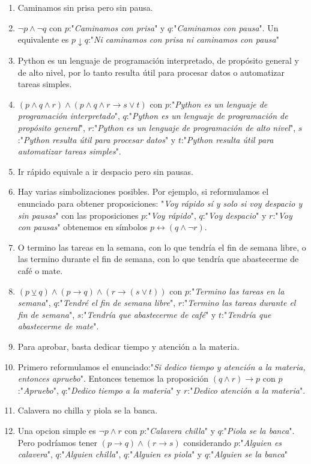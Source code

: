 \documentclass[a4paper]{article}
\newcommand{\answer}{\item[**]}
\newcommand{\then}{\to}
\newcommand{\eq}{\leftrightarrow}
\newcommand{\xor}{\veebar}
\begin{document}
\begin{enumerate}[resume]
\begin{multicols}{2}
\begin{enumerate} [label=(\alph*)]
		\item Caminamos sin prisa pero sin pausa. 
		\answer $\neg p  \land  \neg q$ con $p$:"\textit{Caminamos con prisa}" y $q$:"\textit{Caminamos con pausa}". Un equivalente es $p \downarrow  q$:"\textit{Ni caminamos con prisa ni caminamos con pausa}"

		\item Python es un lenguaje de programación interpretado, de propósito general y de alto nivel, por lo tanto resulta útil para procesar datos o automatizar tareas simples. 
		\answer $( p  \land  q  \land  r ) \land ( p  \land  q  \land  r  \then   s \lor  t )$ con $p$:"\textit{Python es un lenguaje de programación interpretado}", $q$:"\textit{Python es un lenguaje de programación  de propósito general}", $r$:"\textit{Python es un lenguaje de programación de alto nivel}", $s$:"\textit{Python resulta útil para procesar datos}" y $t$:"\textit{Python resulta útil para automatizar tareas simples}".

		\item Ir rápido equivale a ir despacio pero sin pausas. 
		\answer Hay varias simbolizaciones posibles. Por ejemplo, si reformulamos el enunciado para obtener proposiciones: "\textit{Voy rápido sí y solo si voy despacio y sin pausas}" con las proposiciones $p$:"\textit{Voy rápido}", $q$:"\textit{Voy despacio}" y $r$:"\textit{Voy con pausas}" obtenemos en símbolos $p \eq ( q \land \neg r)$.

		\item O termino las tareas en la semana, con lo que tendría el fin de semana libre, o las termino durante el fin de semana, con lo que tendría que abastecerme de café o mate.  
		\answer $(p \xor q) \land ( p \then  q ) \land  ( r \then  ( s \lor  t) )$ con $p$:"\textit{Termino las tareas en la semana}", $q$:"\textit{Tendré el fin de semana libre}", $r$:"\textit{Termino las tareas durante el fin de semana}", $s$:"\textit{Tendría que abastecerme de café}" y $t$:"\textit{Tendría que abastecerme de mate}".

		\item Para aprobar, basta dedicar tiempo y atención a la materia.  
		\answer Primero reformulamos el enunciado:"\textit{Si dedico tiempo y atención a la materia, entonces apruebo}". Entonces tenemos la proposición $( q  \land  r ) \then  p$ con $p$:"\textit{Apruebo}", $q$:"\textit{Dedico tiempo a la materia}" y $r$:"\textit{Dedico atención a la materia}".

		\item Calavera no chilla y piola se la banca.
		\answer Una opcion simple es $\neg p  \land  r$ con $p$:"\textit{Calavera chilla}" y $q$:"\textit{Piola se la banca}". Pero podríamos tener $( p\then q )  \land  ( r\then s )$ considerando $p$:"\textit{Alguien es calavera}", $q$:"\textit{Alguien chilla}", $q$:"\textit{Alguien es piola}" y $q$:"\textit{Alguien se la banca}"


\end{enumerate}
\end{multicols}
\end{enumerate}
\end{document}

